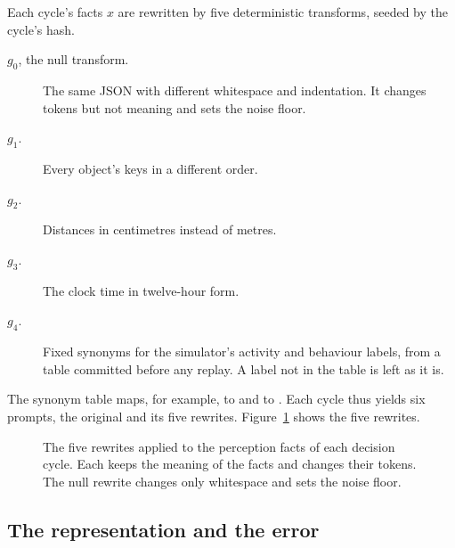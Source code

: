 Each cycle's facts $x$ are rewritten by five deterministic transforms, seeded by the cycle's
hash.
\begin{description}
  \item[$g_0$, the null transform.] The same JSON with different whitespace and indentation.
  It changes tokens but not meaning and sets the noise floor.
  \item[$g_1$.] Every object's keys in a different order.
  \item[$g_2$.] Distances in centimetres instead of metres.
  \item[$g_3$.] The clock time in twelve-hour form.
  \item[$g_4$.] Fixed synonyms for the simulator's activity and behaviour labels, from a table
  committed before any replay.
  A label not in the table is left as it is.
\end{description}
The synonym table maps, for example,  to  and  to
.
Each cycle thus yields six prompts, the original and its five rewrites.
Figure~\ref{fig:ieip-transforms} shows the five rewrites.

\begin{figure}[t]
  \centering
  
  \caption{The five rewrites applied to the perception facts of each decision cycle. Each keeps
  the meaning of the facts and changes their tokens. The null rewrite changes only whitespace and
  sets the noise floor.}
  \label{fig:ieip-transforms}
\end{figure}

\subsection{The representation and the error}

